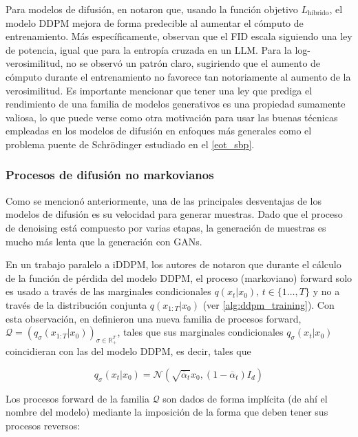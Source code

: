 Para modelos de difusión, en \cite{nichol2021improved} notaron que, usando la función objetivo $L_{\text{híbrido}}$, el modelo DDPM mejora de forma predecible al aumentar el cómputo de entrenamiento. Más específicamente, observan que el FID escala siguiendo una ley de potencia, igual que para la entropía cruzada en un LLM. Para la log-verosimilitud, no se observó un patrón claro, sugiriendo que el aumento de cómputo durante el entrenamiento no favorece tan notoriamente al aumento de la verosimilitud. Es importante mencionar que tener una ley que prediga el rendimiento de una familia de modelos generativos es una propiedad sumamente valiosa, lo que puede verse como otra motivación para usar las buenas técnicas empleadas en los modelos de difusión en enfoques más generales como el problema puente de Schrödinger estudiado en el \autoref{eot_sbp}.

\subsubsection{Procesos de difusión no markovianos}

Como se mencionó anteriormente, una de las principales desventajas de los modelos de difusión es su velocidad para generar muestras. Dado que el proceso de denoising está compuesto por varias etapas, la generación de muestras es mucho más lenta que la generación con GANs.

En un trabajo paralelo a iDDPM, los autores de \cite{song2022denoising} notaron que durante el cálculo de la función de pérdida del modelo DDPM, el proceso (markoviano) forward solo es usado a través de las marginales condicionales $q(x_t|x_0),\,t\in\{1\ldots,T\}$ y no a través de la distribución conjunta $q(x_{1:T}|x_0)$ (ver \autoref{alg:ddpm_training}). Con esta observación, en \cite{song2022denoising} definieron una nueva familia de procesos forward, $\mathcal{Q} = \left(q_\sigma(x_{1:T}|x_0)\right)_{\sigma\in\mathbb{R}_+^T}$, tales que sus marginales condicionales $q_\sigma(x_t|x_0)$ coincidieran con las del modelo DDPM, es decir, tales que

\begin{equation*}
    q_\sigma(x_t|x_0) = \mathcal{N}\left(\sqrt{\overline{\alpha}_t}x_0,(1-\overline{\alpha}_t)I_d\right)
\end{equation*}

Los procesos forward de la familia $\mathcal{Q}$ son dados de forma implícita (de ahí el nombre del modelo) mediante la imposición de la forma que deben tener sus procesos reversos:

